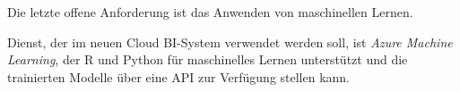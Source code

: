 Die letzte offene Anforderung ist das Anwenden von maschinellen Lernen. 


Dienst, der im neuen Cloud BI-System verwendet werden soll, ist \textit{Azure Machine Learning}, der R und Python für maschinelles Lernen unterstützt und die trainierten Modelle über eine API zur Verfügung stellen kann. 



